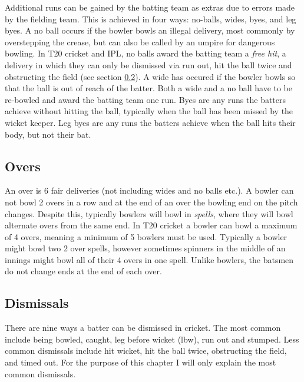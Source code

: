 \documentclass[12pt,a4paper]{report}
\theoremstyle{definition}
\begin{document}
Additional runs can be gained by the batting team as extras due to errors made by the fielding team. 
This is achieved in four ways: no-balls, wides, byes, and leg byes. 
A no ball occurs if the bowler bowls an illegal delivery, most commonly by overstepping the crease, but can also be called by an umpire for dangerous bowling.
In T20 cricket and IPL, no balls award the batting team a \emph{free hit}, a delivery in which they can only be dismissed via run out, hit the ball twice and obstructing the field (see section \ref{sec:Dismissals}).
A wide has occured if the bowler bowls so that the ball is out of reach of the batter.
Both a wide and a no ball have to be re-bowled and award the batting team one run.
Byes are any runs the batters achieve without hitting the ball, typically when the ball has been missed by the wicket keeper.
Leg byes are any runs the batters achieve when the ball hits their body, but not their bat.

\subsection{Overs} \label{sec:Overs}

An over is 6 fair deliveries (not including wides and no balls etc.).
A bowler can not bowl 2 overs in a row and at the end of an over the bowling end on the pitch changes. 
Despite this, typically bowlers will bowl in \emph{spells}, where they will bowl alternate overs from the same end.
In T20 cricket a bowler can bowl a maximum of 4 overs, meaning a minimum of 5 bowlers must be used. 
Typically a bowler might bowl two 2 over spells, however sometimes spinners in the middle of an innings might bowl all of their 4 overs in one spell.
Unlike bowlers, the batsmen do not change ends at the end of each over. 

\subsection{Dismissals} \label{sec:Dismissals}

There are nine ways a batter can be dismissed in cricket. 
The most common include being bowled, caught, leg before wicket (lbw), run out and stumped. 
Less common dismissals include hit wicket, hit the ball twice, obstructing the field, and timed out. 
For the purpose of this chapter I will only explain the most common dismissals. 
\end{document}
